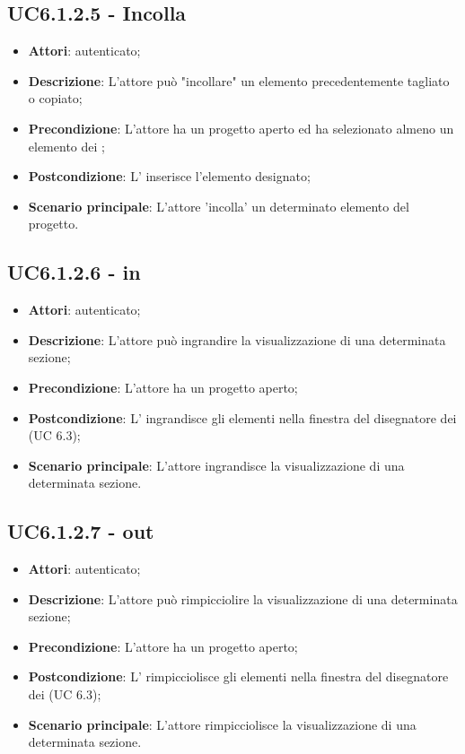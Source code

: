 \subsection{UC6.1.2.5 - Incolla}
\label{ssec:UC6.1.2.5}
\begin{itemize}
\item \textbf{Attori}:  autenticato;
\item \textbf{Descrizione}: L’attore può "incollare" un elemento precedentemente tagliato o copiato;
\item \textbf{Precondizione}: L’attore ha un progetto aperto ed ha selezionato almeno un elemento dei ;
\item \textbf{Postcondizione}: L’ inserisce l’elemento designato;
\item \textbf{Scenario principale}: L'attore 'incolla' un determinato elemento del progetto.
\end{itemize}
\subsection{UC6.1.2.6 -  in}
\label{ssec:UC6.1.2.6}
\begin{itemize}
\item \textbf{Attori}:  autenticato;
\item \textbf{Descrizione}: L’attore può ingrandire la visualizzazione di una determinata sezione;
\item \textbf{Precondizione}: L’attore ha un progetto aperto;
\item \textbf{Postcondizione}: L’ ingrandisce gli elementi nella finestra del disegnatore dei  (UC 6.3);
\item \textbf{Scenario principale}: L'attore ingrandisce la visualizzazione di una determinata sezione.
\end{itemize}
\subsection{UC6.1.2.7 -  out}
\label{ssec:UC6.1.2.7}
\begin{itemize}
\item \textbf{Attori}:  autenticato;
\item \textbf{Descrizione}: L’attore può rimpicciolire la visualizzazione di una determinata sezione;
\item \textbf{Precondizione}: L’attore ha un progetto aperto;
\item \textbf{Postcondizione}: L’ rimpicciolisce gli elementi nella finestra del disegnatore dei  (UC 6.3);
\item \textbf{Scenario principale}: L'attore rimpicciolisce la visualizzazione di una determinata sezione.
\end{itemize}
\newpage
